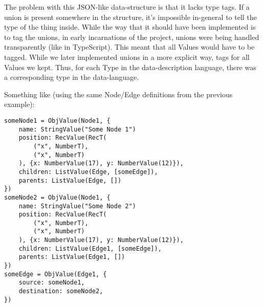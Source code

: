 \documentclass{article}
\begin{document}
The problem with this JSON-like data-structure is that it lacks 
type tags. If a union is present somewhere in the structure, 
it's impossible in-general to tell the type of the thing inside. 
While the way that it should have been implemented is to tag the 
unions, in early incarnations of the project, unions were being handled
transparently (like in TypeScript). This meant that all Values would 
have to be tagged. While we later implemented unions in a more explicit
way, tags for all Values we kept. Thus, for each Type in the 
data-description language, there was a corresponding type in the 
data-language. 

Something like (using the same Node/Edge definitions from the
previous example):

\begin{verbatim}
someNode1 = ObjValue(Node1, {
    name: StringValue("Some Node 1")
    position: RecValue(RecT(
        ("x", NumberT),
        ("x", NumberT)
    ), {x: NumberValue(17), y: NumberValue(12)}),
    children: ListValue(Edge, [someEdge]),
    parents: ListValue(Edge, [])
})
someNode2 = ObjValue(Node1, {
    name: StringValue("Some Node 2")
    position: RecValue(RecT(
        ("x", NumberT),
        ("x", NumberT)
    ), {x: NumberValue(17), y: NumberValue(12)}),
    children: ListValue(Edge1, [someEdge]),
    parents: ListValue(Edge1, [])
})
someEdge = ObjValue(Edge1, {
    source: someNode1,
    destination: someNode2,
})

\end{verbatim}
\end{document}
